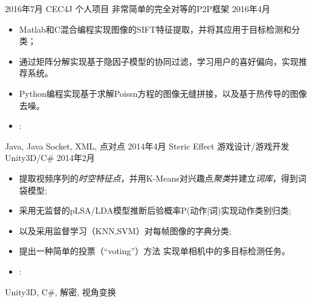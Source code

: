 %
%


 
\begin{experiences}
			
 \experience
    {2016年7月}   { CEC4J}{ 个人项目}{ 非常简单的完全对等的P2P框架}
    { 2016年4月} {
                      \begin{itemize}
                        \item Matlab和C混合编程实现图像的SIFT特征提取，并将其应用于目标检测和分类；
                        \item 通过矩阵分解实现基于隐因子模型的协同过滤，学习用户的喜好偏向，实现推荐系统。
                        \item Python编程实现基于求解Poissn方程的图像无缝拼接，以及基于热传导的图像去噪。
                        \item \faGithub: 
                      \end{itemize}
                    }
                    {Java, Java Socket, XML, 点对点}
  \emptySeparator
  \experience
    {2014年4月} { Steric Effect}{ 游戏设计/游戏开发}{ Unity3D/C\#}
    { 2014年2月}    {
                      \begin{itemize}
                        \item 提取视频序列的\emph{时空特征点}，并用K-Means对兴趣点\emph{聚类}并建立\emph{词库}，得到词袋模型; 
                        \item 采用无监督的pLSA/LDA模型推断后验概率P(动作|词)实现动作类别归类;
                        \item 以及采用监督学习（KNN,SVM）对每帧图像的字典分类;                    
                        \item 提出一种简单的投票（``voting''）方法 实现单相机中的多目标检测任务。
                        \item \faGithub: 
                      \end{itemize}
                    }
                    {Unity3D, C\#, 解密, 视角变换}
	
  \emptySeparator
\end{experiences}
